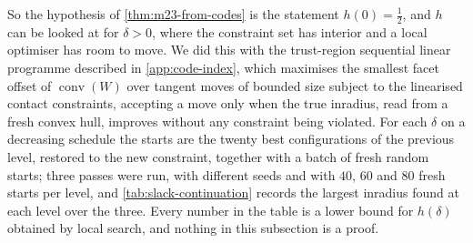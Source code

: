 \documentclass[11pt,reqno]{amsart}
\renewcommand{\_}{\origunderscore\allowbreak}
\numberwithin{equation}{section}
\theoremstyle{plain}
\theoremstyle{definition}
\theoremstyle{remark}
\DeclareMathOperator{\conv}{conv}
\begin{document}
So the hypothesis of \cref{thm:m23-from-codes} is the statement
$h(0)=\tfrac12$, and $h$ can be looked at
for $\delta>0$, where the constraint set has interior and a local
optimiser has room to move. We did this with the trust-region
sequential linear programme described in \cref{app:code-index}, which
maximises the smallest facet offset of $\conv(W)$ over tangent moves of
bounded size subject to the linearised contact constraints, accepting a
move only when the true inradius, read from a fresh convex hull,
improves without any constraint being violated. For each $\delta$ on a
decreasing schedule the starts are the twenty best configurations of
the previous level, restored to the new constraint, together with a
batch of fresh random starts; three passes were run, with different
seeds and with $40$, $60$ and $80$ fresh starts per level, and
\cref{tab:slack-continuation} records the largest inradius found at
each level over the three. Every number in the table is a lower bound
for $h(\delta)$ obtained by local search, and nothing in this
subsection is a proof.
\end{document}
